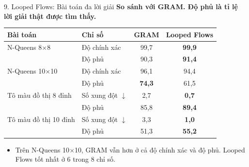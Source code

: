 \begin{frame}{9. Looped Flows: Bài toán đa lời giải}
    \textbf{So sánh với GRAM. Độ phủ là tỉ lệ lời giải thật được tìm thấy.}
    \begin{table}[h]
        \centering
        \small
        \begin{tabular}{llcc}
            \toprule
            \textbf{Bài toán} & \textbf{Chỉ số} & \textbf{GRAM} & \textbf{Looped Flows} \\
            \midrule
            N-Queens 8$\times$8 & Độ chính xác & 99,7 & \textbf{99,9} \\
            & Độ phủ & 90,3 & \textbf{91,4} \\
            N-Queens 10$\times$10 & Độ chính xác & 96,1 & 94,4 \\
            & Độ phủ & \textbf{74,3} & 61,5 \\
            \midrule
            Tô màu đồ thị 8 đỉnh & Số xung đột $\downarrow$ & 2,7 & \textbf{0,7} \\
            & Độ phủ & 85,8 & \textbf{89,4} \\
            Tô màu đồ thị 10 đỉnh & Số xung đột $\downarrow$ & 3,3 & \textbf{1,0} \\
            & Độ phủ & 51,3 & \textbf{55,2} \\
            \bottomrule
        \end{tabular}
    \end{table}
    \vspace{-0.2cm}
    \begin{itemize}
        \item Trên N-Queens 10$\times$10, GRAM vẫn hơn ở cả độ chính xác và độ phủ. Looped Flows tốt nhất ở 6 trong 8 chỉ số.
    \end{itemize}
\end{frame}

